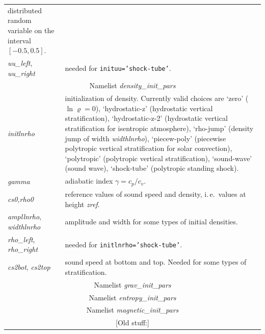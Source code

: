 \documentclass[12pt,twoside,notitlepage,a4paper]{article}
\makeatletter
\newcommand{\code}[1]{\texttt{#1}}
\newcommand{\var}[1]{\textsl{#1}\index{#1@\emph{#1}}\/}
\newcommand{\name}[1]{\textsl{#1}\index{#1}\/}
\makeatother
\begin{document}
\begin{longtable}{lp{}}
                 distributed random variable on the interval $[-0.5,0.5]$.\\
  \var{uu_left},
  \var{uu_right}
               & needed for \code{inituu='shock-tube'}.\\
%
\midrule
  \multicolumn{2}{c}{Namelist \name{density_init_pars}} \\
\midrule
  \var{initlnrho}
               & initialization of density. Currently valid choices are
                 `zero' ($\ln\varrho=0$),
                 `hydrostatic-z' (hydrostatic vertical stratification),
                 `hydrostatic-z-2' (hydrostatic vertical stratification
                                    for isentropic atmosphere),
                 `rho-jump' (density jump of width \var{widthlnrho}),
                 `piecew-poly' (piecewise polytropic vertical
                               stratification for solar convection),
                 `polytropic' (polytropic vertical stratification),
                 `sound-wave' (sound wave),
                 `shock-tube' (polytropic standing shock).\\
  \var{gamma}  & adiabatic index $\gamma=c_p/c_v$. \\
  \var{cs0,rho0}
               & reference values of sound speed and density,
                 i.\,e.~values at height \name{zref}. \\
  \var{ampllnrho},
  \var{widthlnrho}
               & amplitude and width for some types of initial densities. \\
  \var{rho_left},
  \var{rho_right}
               & needed for \code{initlnrho='shock-tube'}. \\
  \var{cs2bot},
  \var{cs2top} & sound speed at bottom and top. Needed for some types of
                 stratification. \\ 
%
\midrule
  \multicolumn{2}{c}{Namelist \name{grav_init_pars}} \\
\midrule
%
\midrule
  \multicolumn{2}{c}{Namelist \name{entropy_init_pars}} \\
\midrule
%
\midrule
  \multicolumn{2}{c}{Namelist \name{magnetic_init_pars}} \\
\midrule





\midrule
  \multicolumn{2}{c}{[Old stuff:]} \\
\midrule




\end{longtable}
\end{document}
